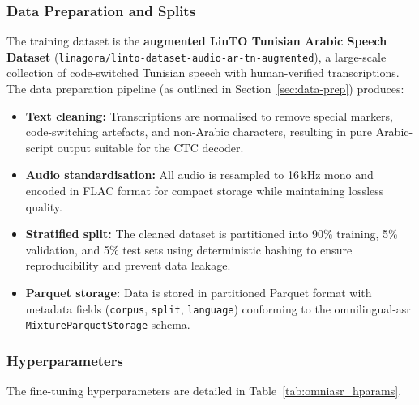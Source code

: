 \documentclass[12pt,a4paper]{report}
\begin{document}
\subsubsection{Data Preparation and Splits}

The training dataset is the \textbf{augmented LinTO Tunisian Arabic Speech Dataset}
(\texttt{linagora/linto-dataset-audio-ar-tn-augmented}), a large-scale collection of
code-switched Tunisian speech with human-verified transcriptions. The data preparation
pipeline (as outlined in Section~\ref{sec:data-prep}) produces:

\begin{itemize}
    \item \textbf{Text cleaning:} Transcriptions are normalised to remove special markers,
    code-switching artefacts, and non-Arabic characters, resulting in pure Arabic-script
    output suitable for the CTC decoder.

    \item \textbf{Audio standardisation:} All audio is resampled to 16\,kHz mono and
    encoded in FLAC format for compact storage while maintaining lossless quality.

    \item \textbf{Stratified split:} The cleaned dataset is partitioned into 90\% training,
    5\% validation, and 5\% test sets using deterministic hashing to ensure reproducibility
    and prevent data leakage.

    \item \textbf{Parquet storage:} Data is stored in partitioned Parquet format with
    metadata fields (\texttt{corpus}, \texttt{split}, \texttt{language}) conforming to the
    omnilingual-asr \texttt{MixtureParquetStorage} schema.
\end{itemize}

\subsubsection{Hyperparameters}

The fine-tuning hyperparameters are detailed in Table~\ref{tab:omniasr_hparams}.
\end{document}
